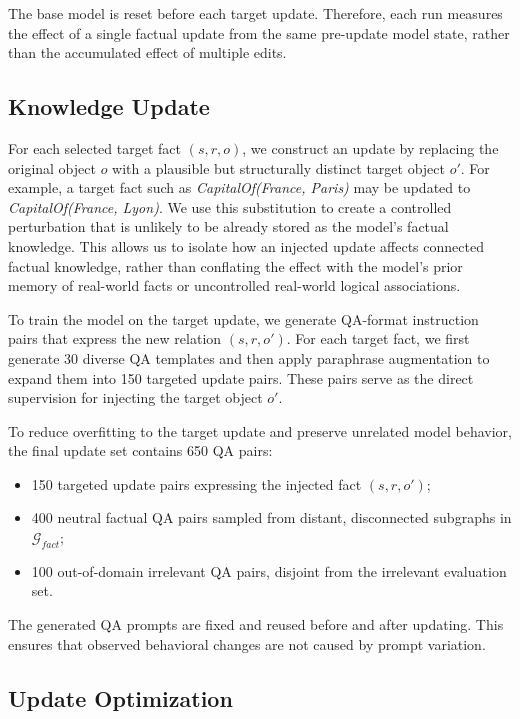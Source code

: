 The base model is reset before each target update. Therefore, each run measures the effect of a single factual update from the same pre-update model state, rather than the accumulated effect of multiple edits.


\subsection{Knowledge Update}

For each selected target fact $(s,r,o)$, we construct an update by replacing the original object $o$ with a plausible but structurally distinct target object $o'$. For example, a target fact such as \textit{CapitalOf(France, Paris)} may be updated to \textit{CapitalOf(France, Lyon)}. We use this substitution to create a controlled perturbation that is unlikely to be already stored as the model's factual knowledge. This allows us to isolate how an injected update affects connected factual knowledge, rather than conflating the effect with the model's prior memory of real-world facts or uncontrolled real-world logical associations.

To train the model on the target update, we generate QA-format instruction pairs that express the new relation $(s,r,o')$. For each target fact, we first generate 30 diverse QA templates and then apply paraphrase augmentation to expand them into 150 targeted update pairs. These pairs serve as the direct supervision for injecting the target object $o'$.

To reduce overfitting to the target update and preserve unrelated model behavior, the final update set contains 650 QA pairs:

\begin{itemize}
    \setlength\itemsep{0em}
    \item 150 targeted update pairs expressing the injected fact $(s,r,o')$;
    \item 400 neutral factual QA pairs sampled from distant, disconnected subgraphs in $\mathcal{G}_{fact}$;
    \item 100 out-of-domain irrelevant QA pairs, disjoint from the irrelevant evaluation set.
\end{itemize}

The generated QA prompts are fixed and reused before and after updating. This ensures that observed behavioral changes are not caused by prompt variation.

\subsection{Update Optimization}

